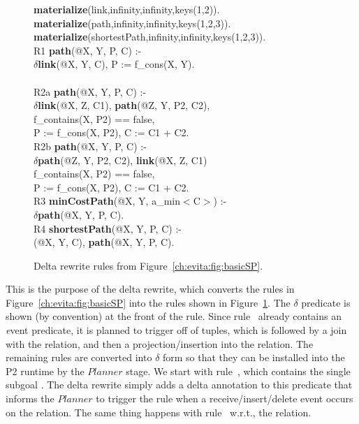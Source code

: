 \begin{figure}[!t]
\ssp
\centering
\begin{boxedminipage}{\linewidth}
{\bf materialize}(link,infinity,infinity,keys(1,2)). \\
{\bf materialize}(path,infinity,infinity,keys(1,2,3)).  \\
{\bf materialize}(shortestPath,infinity,infinity,keys(1,2,3)). \\
  
R1 {\bf path}(@X, Y, P, C) :- \\
\datalogspace $\delta${\bf link}(@X, Y, C), P := f\_cons(X, Y). \\
\\
R2a {\bf path}(@X, Y, P, C) :- \\
\datalogspace $\delta${\bf link}(@X, Z, C1), {\bf path}(@Z, Y, P2, C2),\\
\datalogspace f\_contains(X, P2) == false, \\
\datalogspace P := f\_cons(X, P2), C := C1 + C2. \\

R2b {\bf path}(@X, Y, P, C) :- \\
\datalogspace $\delta${\bf path}(@Z, Y, P2, C2), {\bf link}(@X, Z, C1) \\
\datalogspace f\_contains(X, P2) == false, \\
\datalogspace P := f\_cons(X, P2), C := C1 + C2. \\


R3 {\bf minCostPath}(@X, Y, a\_min$<$C$>$) :-  \\
\datalogspace $\delta${\bf path}(@X, Y, P, C). \\ 

R4 {\bf shortestPath}(@X, Y, P, C) :- \\
(@X, Y, C), {\bf path}(@X, Y, P, C).

\end{boxedminipage}
\caption{\label{ch:evita:fig:basicSPDelta}Delta rewrite rules from Figure~\ref{ch:evita:fig:basicSP}.}
\end{figure}

This is the purpose of the delta rewrite, which converts the rules in
Figure~\ref{ch:evita:fig:basicSP} into the rules shown in
Figure~\ref{ch:evita:fig:basicSPDelta}.  The $\delta$ predicate is shown (by
convention) at the front of the rule.  Since rule~ already contains an
{\emph event} predicate, it is planned to trigger off of 
tuples, which is followed by a join with the  relation, and then a
projection/insertion into the  relation.  The remaining rules
are converted into $\delta$ form so that they can be installed into the P2
runtime by the $Planner$ stage.  We start with rule~, which contains the
single subgoal .  The delta rewrite simply adds a delta annotation to
this predicate that informs the $Planner$ to trigger the rule when a
receive/insert/delete event occurs on the  relation.  The same thing
happens with rule~ w.r.t., the  relation.

